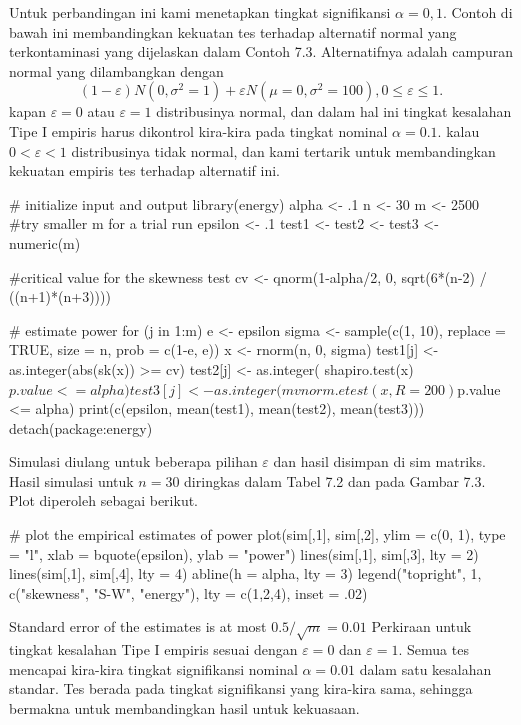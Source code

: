 \documentclass[a4paper,12pt]{article}
\theoremstyle{definition}
\begin{document}
Untuk perbandingan ini kami menetapkan tingkat signifikansi $\alpha = 0,1$. Contoh di bawah ini membandingkan kekuatan tes terhadap alternatif normal yang terkontaminasi yang dijelaskan dalam Contoh 7.3. Alternatifnya adalah campuran normal yang dilambangkan dengan 
\begin{equation}
    \left ( 1-\varepsilon  \right )N\left ( 0,\sigma ^{2}=1 \right )+\varepsilon N\left ( \mu =0,\sigma ^{2}=100 \right ),  0\leq \varepsilon \leq 1.
\end{equation}
kapan $\varepsilon=0$ atau $\varepsilon=1$  distribusinya normal, dan dalam hal ini tingkat kesalahan Tipe I empiris harus dikontrol kira-kira pada tingkat nominal $\alpha =0.1$. kalau $0 < \varepsilon < 1$ distribusinya tidak normal, dan kami tertarik untuk membandingkan kekuatan empiris tes terhadap alternatif ini.
\begin{spverbatim}
# initialize input and output
library(energy)
alpha <- .1
n <- 30
m <- 2500         #try smaller m for a trial run
epsilon <- .1
test1 <- test2 <- test3 <- numeric(m)

#critical value for the skewness test
cv <- qnorm(1-alpha/2, 0, sqrt(6*(n-2) / ((n+1)*(n+3))))

# estimate power
for (j in 1:m) {
     e <- epsilon
     sigma <- sample(c(1, 10), replace = TRUE,
          size = n, prob = c(1-e, e))
     x <- rnorm(n, 0, sigma)
     test1[j] <- as.integer(abs(sk(x)) >= cv)
     test2[j] <- as.integer(
                 shapiro.test(x)$p.value <= alpha)
     test3[j] <- as.integer(
                 mvnorm.etest(x, R=200)$p.value <= alpha)
}
print(c(epsilon, mean(test1), mean(test2), mean(test3)))
detach(package:energy)
\end{spverbatim}
Simulasi diulang untuk beberapa pilihan $\varepsilon$ dan hasil disimpan di
sim matriks. Hasil simulasi untuk $n=30$ diringkas dalam Tabel 7.2 dan
pada Gambar 7.3. Plot diperoleh sebagai berikut.
\begin{spverbatim}
# plot the empirical estimates of power
plot(sim[,1], sim[,2], ylim = c(0, 1), type = "l",
     xlab = bquote(epsilon), ylab = "power")
lines(sim[,1], sim[,3], lty = 2)
lines(sim[,1], sim[,4], lty = 4)
abline(h = alpha, lty = 3)
legend("topright", 1, c("skewness", "S-W", "energy"),
     lty = c(1,2,4), inset = .02)
\end{spverbatim}
Standard error of the estimates is at most $0.5/\sqrt{m}=0.01$ Perkiraan untuk tingkat kesalahan Tipe I empiris sesuai dengan $\varepsilon =0 $ dan $\varepsilon =1 $. Semua tes mencapai kira-kira tingkat signifikansi nominal $\alpha =0.01$ dalam satu kesalahan standar. Tes berada pada tingkat signifikansi yang kira-kira sama, sehingga bermakna untuk membandingkan hasil untuk kekuasaan.
\end{document}
